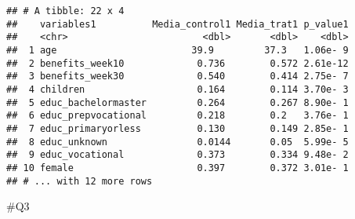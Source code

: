 \documentclass[
]{article}
\begin{document}
\begin{verbatim}
## # A tibble: 22 x 4
##    variables1          Media_control1 Media_trat1 p_value1
##    <chr>                        <dbl>       <dbl>    <dbl>
##  1 age                        39.9         37.3   1.06e- 9
##  2 benefits_week10             0.736        0.572 2.61e-12
##  3 benefits_week30             0.540        0.414 2.75e- 7
##  4 children                    0.164        0.114 3.70e- 3
##  5 educ_bachelormaster         0.264        0.267 8.90e- 1
##  6 educ_prepvocational         0.218        0.2   3.76e- 1
##  7 educ_primaryorless          0.130        0.149 2.85e- 1
##  8 educ_unknown                0.0144       0.05  5.99e- 5
##  9 educ_vocational             0.373        0.334 9.48e- 2
## 10 female                      0.397        0.372 3.01e- 1
## # ... with 12 more rows
\end{verbatim}

\#Q3
\end{document}
